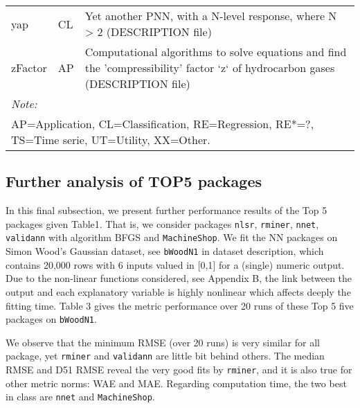\begin{Schunk}
\begin{longtable}[t]{ll>{\raggedright\arraybackslash}p{10cm}}
yap & CL & Yet another PNN, with a N-level response, where N > 2 (DESCRIPTION file)\\
zFactor & AP & Computational algorithms to solve equations and find the 'compressibility' factor `z` of hydrocarbon gases (DESCRIPTION file)\\
\bottomrule
\multicolumn{3}{l}{\textit{Note: }}\\
\multicolumn{3}{l}{AP=Application, CL=Classification, RE=Regression, RE*=?, TS=Time serie, UT=Utility, XX=Other.}\\
\end{longtable}
\endgroup{}

\end{Schunk}

\hypertarget{further-analysis-of-top5-packages}{%
\subsection{Further analysis of TOP5
packages}\label{further-analysis-of-top5-packages}}

In this final subsection, we present further performance results of the
Top 5 packages given Table1. That is, we consider packages
\texttt{nlsr}, \texttt{rminer}, \texttt{nnet}, \texttt{validann} with
algorithm BFGS and \texttt{MachineShop}. We fit the NN packages on Simon
Wood's Gaussian dataset, see \texttt{bWoodN1} in dataset description,
which contains 20,000 rows with 6 inputs valued in {[}0,1{]} for a
(single) numeric output. Due to the non-linear functions considered, see
Appendix B, the link between the output and each explanatory variable is
highly nonlinear which affects deeply the fitting time. Table 3 gives
the metric performance over 20 runs of these Top 5 five packages on
\texttt{bWoodN1}.

We observe that the minimum RMSE (over 20 runs) is very similar for all
package, yet \texttt{rminer} and \texttt{validann} are little bit behind
others. The median RMSE and D51 RMSE reveal the very good fits by
\texttt{rminer}, and it is also true for other metric norms: WAE and
MAE. Regarding computation time, the two best in class are \texttt{nnet}
and \texttt{MachineShop}.

